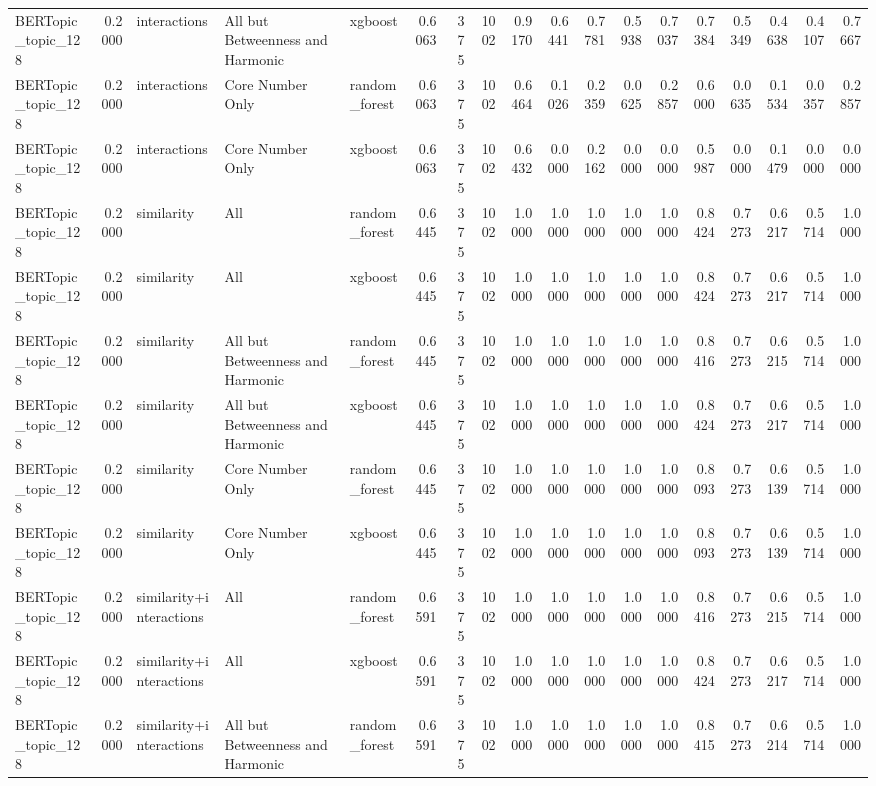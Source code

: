 \begin{tabular}{lrlllrrrrrrrrrrrrr}
BERTopic_topic_128 & 0.2000 & interactions & All but Betweenness and Harmonic & xgboost & 0.6063 & 375 & 1002 & 0.9170 & 0.6441 & 0.7781 & 0.5938 & 0.7037 & 0.7384 & 0.5349 & 0.4638 & 0.4107 & 0.7667 \\
BERTopic_topic_128 & 0.2000 & interactions & Core Number Only & random_forest & 0.6063 & 375 & 1002 & 0.6464 & 0.1026 & 0.2359 & 0.0625 & 0.2857 & 0.6000 & 0.0635 & 0.1534 & 0.0357 & 0.2857 \\
BERTopic_topic_128 & 0.2000 & interactions & Core Number Only & xgboost & 0.6063 & 375 & 1002 & 0.6432 & 0.0000 & 0.2162 & 0.0000 & 0.0000 & 0.5987 & 0.0000 & 0.1479 & 0.0000 & 0.0000 \\
BERTopic_topic_128 & 0.2000 & similarity & All & random_forest & 0.6445 & 375 & 1002 & 1.0000 & 1.0000 & 1.0000 & 1.0000 & 1.0000 & 0.8424 & 0.7273 & 0.6217 & 0.5714 & 1.0000 \\
BERTopic_topic_128 & 0.2000 & similarity & All & xgboost & 0.6445 & 375 & 1002 & 1.0000 & 1.0000 & 1.0000 & 1.0000 & 1.0000 & 0.8424 & 0.7273 & 0.6217 & 0.5714 & 1.0000 \\
BERTopic_topic_128 & 0.2000 & similarity & All but Betweenness and Harmonic & random_forest & 0.6445 & 375 & 1002 & 1.0000 & 1.0000 & 1.0000 & 1.0000 & 1.0000 & 0.8416 & 0.7273 & 0.6215 & 0.5714 & 1.0000 \\
BERTopic_topic_128 & 0.2000 & similarity & All but Betweenness and Harmonic & xgboost & 0.6445 & 375 & 1002 & 1.0000 & 1.0000 & 1.0000 & 1.0000 & 1.0000 & 0.8424 & 0.7273 & 0.6217 & 0.5714 & 1.0000 \\
BERTopic_topic_128 & 0.2000 & similarity & Core Number Only & random_forest & 0.6445 & 375 & 1002 & 1.0000 & 1.0000 & 1.0000 & 1.0000 & 1.0000 & 0.8093 & 0.7273 & 0.6139 & 0.5714 & 1.0000 \\
BERTopic_topic_128 & 0.2000 & similarity & Core Number Only & xgboost & 0.6445 & 375 & 1002 & 1.0000 & 1.0000 & 1.0000 & 1.0000 & 1.0000 & 0.8093 & 0.7273 & 0.6139 & 0.5714 & 1.0000 \\
BERTopic_topic_128 & 0.2000 & similarity+interactions & All & random_forest & 0.6591 & 375 & 1002 & 1.0000 & 1.0000 & 1.0000 & 1.0000 & 1.0000 & 0.8416 & 0.7273 & 0.6215 & 0.5714 & 1.0000 \\
BERTopic_topic_128 & 0.2000 & similarity+interactions & All & xgboost & 0.6591 & 375 & 1002 & 1.0000 & 1.0000 & 1.0000 & 1.0000 & 1.0000 & 0.8424 & 0.7273 & 0.6217 & 0.5714 & 1.0000 \\
BERTopic_topic_128 & 0.2000 & similarity+interactions & All but Betweenness and Harmonic & random_forest & 0.6591 & 375 & 1002 & 1.0000 & 1.0000 & 1.0000 & 1.0000 & 1.0000 & 0.8415 & 0.7273 & 0.6214 & 0.5714 & 1.0000 \\

\end{tabular}
